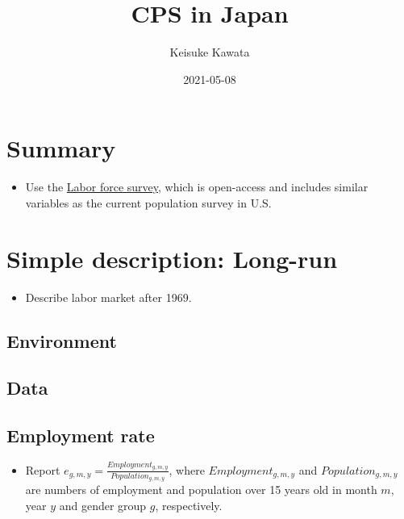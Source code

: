\documentclass[
]{book}
\title{CPS in Japan}
\author{Keisuke Kawata}
\date{2021-05-08}
\providecommand{\tightlist}{%
  \setlength{\itemsep}{0pt}\setlength{\parskip}{0pt}}
\begin{document}
\maketitle

{
\setcounter{tocdepth}{1}
\tableofcontents
}
\hypertarget{summary}{%
\chapter{Summary}\label{summary}}

\begin{itemize}
\tightlist
\item
  Use the \href{https://www.stat.go.jp/english/data/roudou/index.html}{Labor force survey}, which is open-access and includes similar variables as the current population survey in U.S.
\end{itemize}

\hypertarget{simple-description-long-run}{%
\chapter{Simple description: Long-run}\label{simple-description-long-run}}

\begin{itemize}
\tightlist
\item
  Describe labor market after 1969.
\end{itemize}

\hypertarget{environment}{%
\section{Environment}\label{environment}}

\hypertarget{data}{%
\section{Data}\label{data}}

\hypertarget{employment-rate}{%
\section{Employment rate}\label{employment-rate}}

\begin{itemize}
\tightlist
\item
  Report \(e_{g,m,y} = \frac{Employment_{g,m,y}}{Population_{g,m,y}}\), where \(Employment_{g,m,y}\) and \(Population_{g,m,y}\) are numbers of employment and population over 15 years old in month \(m\), year \(y\) and gender group \(g\), respectively.
\end{itemize}
\end{document}
